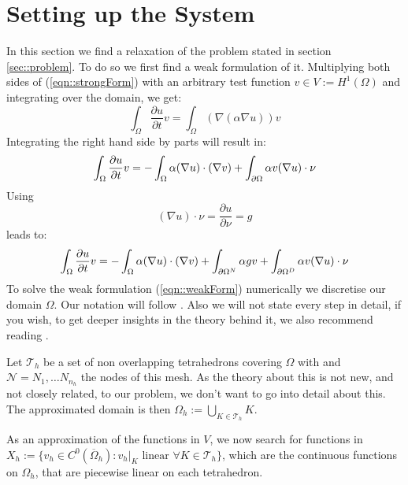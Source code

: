 
\section{\label{sec::setupSystem}Setting up the System}
In this section we find a relaxation of the problem stated in section \ref{sec::problem}. To do so we first find a weak formulation of it. Multiplying both sides of (\ref{eqn::strongForm}) with an arbitrary test function $v\in V:=H^1(\Omega)$ and integrating over the domain, we get:
\begin{equation*}
	\int_{\Omega} \frac{\partial u}{\partial t} v = \int_{\Omega} (\nabla(\alpha\nabla u)) v
\end{equation*}
Integrating the right hand side by parts will result in:
\begin{equation*}
	\int_{\Omega} \frac{\partial u}{\partial t} v = -\int_{\Omega} \alpha(\nabla u) \cdot (\nabla v) + \int_{\partial \Omega} \alpha v (\nabla u) \cdot \nu\\
\end{equation*}
Using
\begin{equation*}
	(\nabla u)\cdot \nu = \frac{\partial u}{\partial \nu} = g
\end{equation*}
leads to:
\begin{equation}
	\label{eqn::weakForm}
	\int_{\Omega} \frac{\partial u}{\partial t} v = -\int_{\Omega} \alpha(\nabla u) \cdot (\nabla v) +  \int_{\partial\Omega^N} \alpha gv + \int_{\partial \Omega^D} \alpha v (\nabla u) \cdot \nu\\
\end{equation}
To solve the weak formulation (\ref{eqn::weakForm}) numerically we discretise our domain $\Omega$. Our notation will follow \cite{quarteroni2009numerical}. Also we will not state every step in detail, if you wish, to get deeper insights in the theory behind it, we also recommend reading \cite{quarteroni2009numerical}.

Let $\mathcal{T}_h$ be a set of non overlapping tetrahedrons covering $\Omega$ with and $\mathcal{N}={N_1,\dots N_{n_h}}$ the nodes of this mesh. As the theory about this is not new, and not closely related, to our problem, we don't want to go into detail about this. The approximated domain is then $\Omega_h:=\bigcup_{K\in\mathcal{T}_h}K$.

As an approximation of the functions in $V$, we now search for functions in $X_h:=\{v_h\in C^0(\overline{\Omega}_h) : v_h|_K \text{ linear } \forall K\in \mathcal{T}_h\}$, which are the continuous functions on $\Omega_h$, that are piecewise linear on each tetrahedron.

